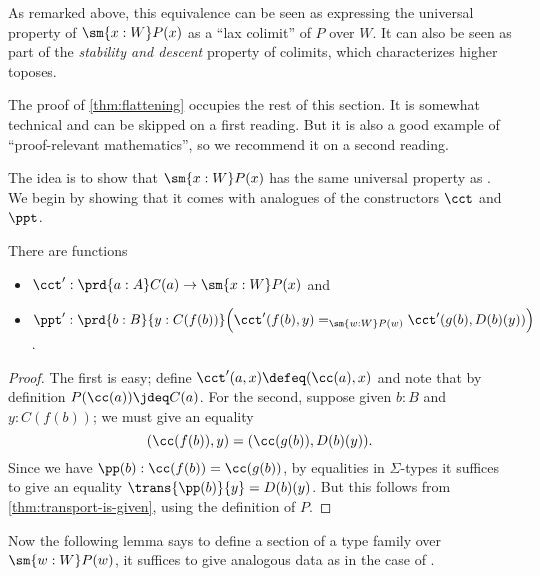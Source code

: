 %
As remarked above, this equivalence can be seen as expressing the universal property of $\sm{x:W} P(x)$ as a ``lax colimit'' of $P$ over $W$.
It can also be seen as part of the \emph{stability and descent} property of colimits, which characterizes higher toposes.%
%
%

The proof of \cref{thm:flattening} occupies the rest of this section.
It is somewhat technical and can be skipped on a first reading.
But it is also a good example of ``proof-relevant mathematics'',
%
so we recommend it on a second reading.

The idea is to show that $\sm{x:W} P(x)$ has the same universal property as \Wtil.
We begin by showing that it comes with analogues of the constructors $\cct$ and $\ppt$.

\begin{lem}\label{thm:flattening-cp}
  There are functions
  \begin{itemize}
  \item $\cct':\prd{a:A} C(a) \to \sm{x:W} P(x)$ and
  \item $\ppt':\prd{b:B}{y:C(f(b))} \Big(\cct'(f(b),y)=_{\sm{w:W}P(w)}\cct'(g(b),D(b)(y))\Big)$.
  \end{itemize}
\end{lem}
\begin{proof}
  The first is easy; define $\cct'(a,x) \defeq (\cc(a),x)$ and note that by definition $P(\cc(a))\jdeq C(a)$.
  For the second, suppose given $b:B$ and $y:C(f(b))$; we must give an equality
  \[ (\cc(f(b)),y) = (\cc(g(b)),D(b)(y)). \]
  Since we have $\pp(b):\cc(f(b))=\cc(g(b))$, by equalities in $\Sigma$-types it suffices to give an equality $\trans{\pp(b)}{y} = D(b)(y)$.
  But this follows from \cref{thm:transport-is-given}, using the definition of $P$.
\end{proof}

Now the following lemma says to define a section of a type family over $\sm{w:W} P(w)$, it suffices to give analogous data as in the case of \Wtil.

